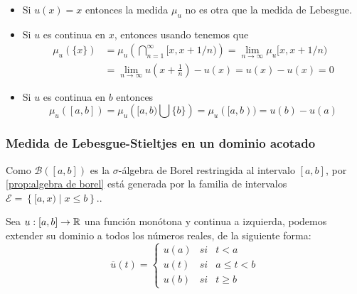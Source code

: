 \begin{obs}
	\begin{itemize} 
		\item Si $u(x)=x$ entonces la medida $\mu_{u}$ no es otra que la medida de Lebesgue.
		\item Si $u$ es continua   en $x$, entonces usando  \cite[Teorema 3.28]{Zo} tenemos que 		
		\begin{equation*}
            \begin{split}
			\mu_{u}(\{x\})&=\mu_{u}\left( \bigcap_{n=1}^{\infty}[x,x+1/n)\right) =\lim_{n \to \infty}\mu_{u}[x,x+1/n)
			\\ &=\lim_{n \to \infty}u(x+\frac{1}{n})-u(x)=u(x)-u(x)=0
            \end{split}
		\end{equation*}
		
		\item  Si $u$ es continua  en $b$ entonces 
		$$\mu_{u}([a,b])=\mu_{u}\left([a,b) \bigcup\{b\}\right)=\mu_{u}([a,b))=u(b)-u(a)$$		
	\end{itemize}
\end{obs}

\subsubsection{Medida de  Lebesgue-Stieltjes en un dominio acotado}
 Como $\mathscr{B}([a,b])$  es la $\sigma$-álgebra de Borel restringida al intervalo $[a,b]$,  por \ref{prop:algebra de borel} está generada por la familia de intervalos $\mathcal{E}=\left\lbrace [a,x) \mid x\leq b\right\rbrace $..
 
Sea $u:[a,b]\to\mathbb{R}$ una función  monótona y continua a izquierda, podemos extender su dominio a todos los números reales, de la siguiente forma:
$$\overline{u}(t)=\left\lbrace \begin{array}{rll}
	u(a) &si & t<a\\
	u(t) & si & a\leq t < b\\
	u(b)& si & t\geq b 
\end{array}\right. $$ 

